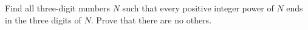 Find all three-digit numbers $N$ such that every positive integer power of $N$ ends in the three digits of $N$. Prove that there are no others.
